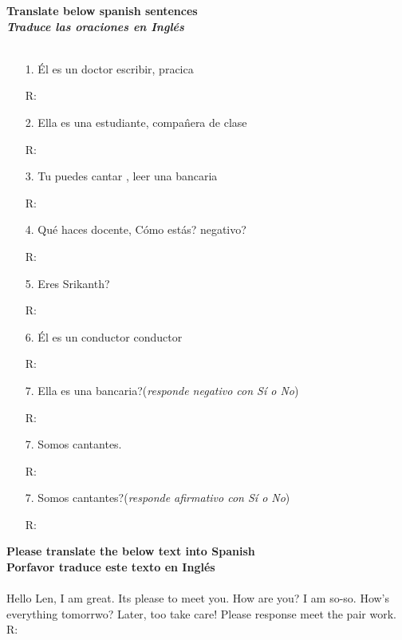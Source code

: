 \documentclass{article}
\begin{document}
\noindent \textbf{Translate below spanish sentences}\\
\noindent \textbf{\textit{Traduce las oraciones en Ingl\'es}}\\\\

\begin{itemize}
\item[1.] \'El es un doctor escribir, pracica
\item[R:]
\item[2.] Ella es una estudiante, compa\^nera de clase
\item[R:] 
\item[3.] Tu puedes cantar , leer una bancaria
\item[R:]
\item[4.] Qu\'e haces docente, C\'omo est\'as? negativo?
\item[R:]
\item[5.] Eres Srikanth?
\item[R:]
\item[6.] \'El es un conductor conductor
\item[R:]
\item[7.] Ella es una bancaria?(\textit{responde negativo con S\'i o No})
\item[R:]
\item[7.] Somos cantantes.
\item[R:]
\item[7.] Somos cantantes?(\textit{responde afirmativo con S\'i o No})
\item[R:]
\end{itemize}

\newpage
\noindent \textbf{Please translate the below text into Spanish}\\
\noindent \textbf{Porfavor traduce este texto en Ingl\'es}\\\\
\noindent Hello Len, I am great. Its please to meet you. How are you? I am so-so.
How's everything tomorrwo? Later, too take care! Please response meet the pair work.\\
R: 
\end{document}

